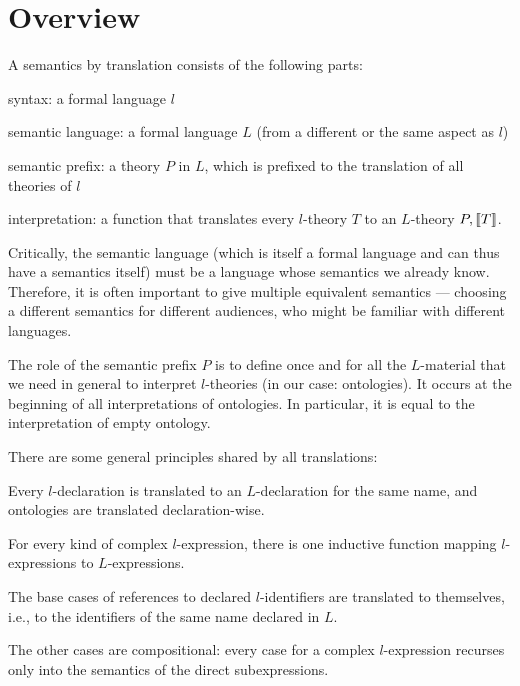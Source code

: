 \section{Overview}

A semantics by translation consists of the following parts:
\begin{compactitem}
 \item syntax: a formal language $l$
 \item semantic language: a formal language $L$ (from a different or the same aspect as $l$)
 \item semantic prefix: a theory $P$ in $L$, which is prefixed to the translation of all theories of $l$
 \item interpretation: a function that translates every $l$-theory $T$ to an $L$-theory $P,\llbracket T\rrbracket$.
\end{compactitem}

Critically, the semantic language (which is itself a formal language and can thus have a semantics itself) must be a language whose semantics we already know.
Therefore, it is often important to give multiple equivalent semantics --- choosing a different semantics for different audiences, who might be familiar with different languages.

The role of the semantic prefix $P$ is to define once and for all the $L$-material that we need in general to interpret $l$-theories (in our case: ontologies).
It occurs at the beginning of all interpretations of ontologies.
In particular, it is equal to the interpretation of empty ontology.

There are some general principles shared by all translations:
\begin{compactitem}
 \item Every $l$-declaration is translated to an $L$-declaration for the same name, and ontologies are translated declaration-wise.
 \item For every kind of complex $l$-expression, there is one inductive function mapping $l$-expressions to $L$-expressions.
 \item The base cases of references to declared $l$-identifiers are translated to themselves, i.e., to the identifiers of the same name declared in $L$.
 \item The other cases are compositional: every case for a complex $l$-expression recurses only into the semantics of the direct subexpressions.
\end{compactitem}

